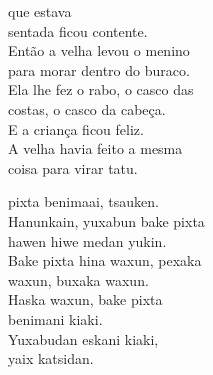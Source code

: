 

 que estava\\
sentada ficou contente.\\
Então a velha levou o menino\\
para morar dentro do buraco.\\
Ela lhe fez o rabo, o casco das\\
costas, o casco da cabeça.\\
E a criança ficou feliz.\\
A velha havia feito a mesma\\
coisa para virar tatu.

\vspace{2em}

 pixta benimaai, tsauken.\\
Hanunkain, yuxabun bake pixta\\
hawen hiwe medan yukin.\\
Bake pixta hina waxun, pexaka\\
waxun, buxaka waxun.\\
Haska waxun, bake pixta\\
benimani kiaki.\\
Yuxabudan eskani kiaki,\\
yaix katsidan.

